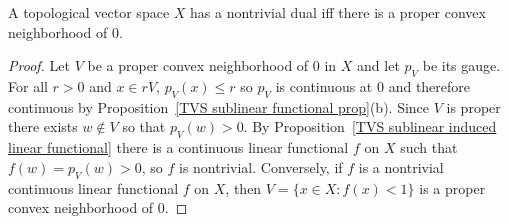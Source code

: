 \begin{proposition}\label{TVS nontrivial dual iff proper convex nbhd}
A topological vector space $X$ has a nontrivial dual iff there is a proper convex neighborhood of $0$.
\end{proposition}
\begin{proof}
Let $V$ be a proper convex neighborhood of $0$ in $X$ and let $p_V$ be its gauge. For all $r>0$ and $x\in rV$, $p_V(x)\leq r$ so $p_V$ is continuous at $0$ and therefore continuous by Proposition~\ref{TVS sublinear functional prop}(b). Since $V$ is proper there exists $w\notin V$ so that $p_V(w)>0$. By Proposition~\ref{TVS sublinear induced linear functional} there is a continuous linear functional $f$ on $X$ such that $f(w)=p_V(w)>0$, so $f$ is nontrivial. Conversely, if $f$ is a nontrivial continuous linear functional $f$ on $X$, then $V=\{x\in X:f(x)<1\}$ is a proper convex neighborhood of $0$.
\end{proof}
